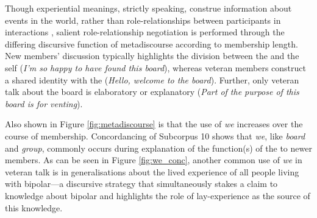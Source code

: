 %
\noindent Though experiential meanings, strictly speaking, construe information about events in the world, rather than role\hyp{}relationships between participants in interactions \cite{eggins_introduction_2004}, salient role\hyp{}relationship negotiation is performed through the differing discursive function of metadiscourse according to membership length. New \glspl{member}' discussion typically highlights the division between the  and the self (\emph{I'm so happy to have found this board}), whereas veteran \glspl{member} construct a shared identity with the  (\emph{Hello, welcome to the board}). Further, only veteran talk about the board is elaboratory or explanatory (\emph{Part of the purpose of this board is for venting}).

Also shown in Figure \ref{fig:metadiscourse} is that the use of \emph{we} increases over the course of membership. Concordancing of Subcorpus 10 shows that \emph{we}, like \emph{board} and \emph{group}, commonly occurs during explanation of the function(s) of the  to newer \glspl{member}. As can be seen in Figure \ref{fig:we_conc}, another common use of \emph{we} in veteran talk is in generalisations about the lived experience of all people living with \gls{bipolar}---a discursive strategy that simultaneously stakes a claim to knowledge about bipolar and highlights the role of lay\hyp{}experience as the source of this knowledge.

